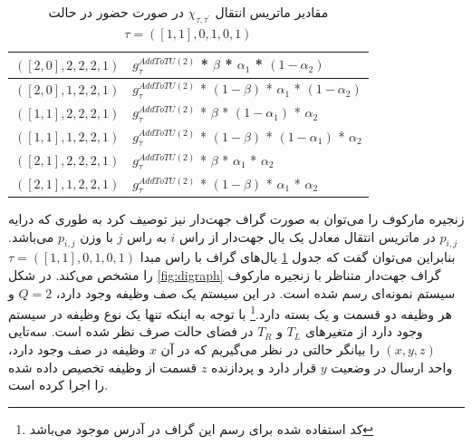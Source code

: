 \begin{table}[H]
\begin{latin}
\begin{tabular}{|l|l|}
$([2,0], 2, 2, 2, 1 )$ & $g_{\tau}^{A d d T o T U ( 2 )}$ * $\beta$ * $\alpha_1$ * $(1 - \alpha_2)$        \\ \hline
$([2,0], 1, 2, 2, 1 )$ & $g_{\tau}^{A d d T o T U ( 2 )}$ * $(1 - \beta)$ * $\alpha_1$ * $(1 - \alpha_2)$  \\ \hline
$([1,1], 2, 2, 2, 1 )$ & $g_{\tau}^{A d d T o T U ( 2 )}$ * $\beta$ * $(1 - \alpha_1)$ * $\alpha_2$        \\ \hline
$([1,1], 1, 2, 2, 1 )$ & $g_{\tau}^{A d d T o T U ( 2 )}$ * $(1 - \beta)$ * $(1 - \alpha_1)$ * $\alpha_2$  \\ \hline
$([2,1], 2, 2, 2, 1 )$ & $g_{\tau}^{A d d T o T U ( 2 )}$ * $\beta$ * $\alpha_1$ * $\alpha_2$              \\ \hline
$([2,1], 1, 2, 2, 1 )$ & $g_{\tau}^{A d d T o T U ( 2 )}$ * $(1 - \beta)$ * $\alpha_1$ * $\alpha_2$        \\ \hline



\end{tabular}
	\end{latin}
\caption{مقادیر ماتریس انتقال $\chi_{\tau, \tau^{\prime}}$ در صورت حضور در حالت $\tau = ( [1, 1], 0, 1, 0, 1 )$}
	\label{table:transitions}
\end{table}
زنجیره مارکوف را می‌توان به صورت گراف جهت‌دار نیز توصیف کرد به طوری که درایه $p_{i, j}$ در ماتریس انتقال معادل یک یال جهت‌دار از راس $i$ به راس $j$ با وزن $p_{i, j}$ می‌باشد. بنابراین می‌توان گفت که جدول \ref{table:transitions} یال‌های گراف با راس مبدا $\tau = ( [1, 1], 0, 1, 0, 1 )$ را مشخص می‌کند. در شکل \ref{fig:digraph} گراف جهت‌دار متناظر با زنجیره مارکوف سیستم نمونه‌ای رسم شده است. در این سیستم یک صف وظیفه وجود دارد، \(Q = 2\) و هر وظیفه دو قسمت و یک بسته دارد.\footnote{کد استفاده شده برای رسم این گراف در آدرس  موجود می‌باشد} با توجه به اینکه تنها یک نوع وظیفه در سیستم وجود دارد از متغیرهای $T_L$ و $T_R$ در فضای حالت صرف نظر شده است. سه‌تایی $(x, y, z)$ را بیانگر حالتی در نظر می‌گیریم که در آن $x$ وظیفه در صف وجود دارد، واحد ارسال در وضعیت $y$ قرار دارد و پردازنده $z$ قسمت از وظیفه تخصیص داده شده را اجرا کرده است.

